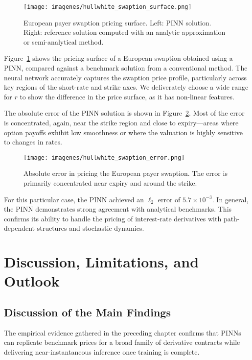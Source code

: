\documentclass[12pt]{report} %
\theoremstyle{plain} %
\theoremstyle{definition} %
\theoremstyle{remark} %
\begin{document}
\begin{figure}[H]
	\centering
	\texttt{[image: imagenes/hullwhite\_swaption\_surface.png]}
	\caption{European payer swaption pricing surface. Left: PINN solution. Right: reference solution computed with an analytic approximation or semi-analytical method.}
	\label{fig:swaption_surface}
\end{figure}

Figure~\ref{fig:swaption_surface} shows the pricing surface of a European swaption obtained 
using a PINN, compared against a benchmark solution from a conventional method. The neural 
network accurately captures the swaption price profile, particularly across key regions of 
the short-rate and strike axes. We deliverately choose a wide range for $r$ to show 
the difference in the price surface, as it has non-linear features.

The absolute error of the PINN solution is shown in Figure~\ref{fig:swaption_error}. Most of 
the error is concentrated, again, near the strike region and close to expiry—areas where option payoffs 
exhibit low smoothness or where the valuation is highly sensitive to changes in rates.

\begin{figure}[H]
	\centering
	\texttt{[image: imagenes/hullwhite\_swaption\_error.png]}
	\caption{Absolute error in pricing the European payer swaption. The error is primarily concentrated near expiry and around the strike.}
	\label{fig:swaption_error}
\end{figure}

For this particular case, the PINN achieved an \(\ell_2\) error of \(5.7\times10^{-3}\). In general, 
the PINN demonstrates strong agreement with analytical benchmarks. This confirms its ability to handle the 
pricing of interest-rate derivatives with path-dependent structures and stochastic dynamics.

\chapter{Discussion, Limitations, and Outlook}
\label{ch:discussion}

\section{Discussion of the Main Findings}

The empirical evidence gathered in the preceding chapter confirms that PINNs 
can replicate benchmark prices for a broad family of derivative 
contracts while delivering near-instantaneous inference once training is complete.
\end{document}

